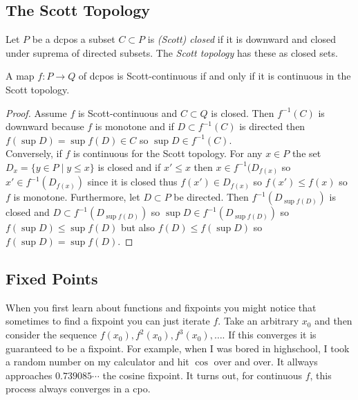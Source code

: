 \documentclass[12pt]{article}
\begin{document}
\subsection{The Scott Topology}

\begin{defn}
Let $P$ be a dcpos a subset $C \subset P$ is \textit{(Scott) closed} if it is downward and closed under suprema of directed subsets. The \textit{Scott topology} has these as closed sets.  
\end{defn}

\begin{prop}
A map $f : P \to Q$ of dcpos is Scott-continuous if and only if it is continuous in the Scott topology.  
\end{prop}

\begin{proof}
Assume $f$ is Scott-continuous and $C \subset Q$ is closed. Then $f^{-1}(C)$ is downward because $f$ is monotone and if $D \subset f^{-1}(C)$ is directed then $f(\sup D) = \sup f(D) \in C$ so $\sup D \in f^{-1}(C)$. 
\bigskip\\
Conversely, if $f$ is continuous for the Scott topology. For any $x \in P$ the set $D_x = \{ y \in P \mid y \le x \}$ is closed and if $x' \le x$ then $x \in f^{-1}(D_{f(x)}$ so $x' \in f^{-1}(D_{f(x)})$ since it is closed thus $f(x') \in D_{f(x)}$ so $f(x') \le f(x)$ so $f$ is monotone. Furthermore, let $D \subset P$ be directed. Then $f^{-1}(D_{\sup f(D)})$ is closed and $D \subset f^{-1}(D_{\sup f(D)})$ so $\sup D \in f^{-1}(D_{\sup f(D)})$ so $f(\sup D) \le \sup f(D)$ but also $f(D) \le f(\sup D)$ so $f(\sup D) = \sup f(D)$.  
\end{proof}

\subsection{Fixed Points}

\renewcommand{\fix}{\mathsf{fix}}
\renewcommand{\it}{\mathsf{it}}

When you first learn about functions and fixpoints you might notice that sometimes to find a fixpoint you can just iterate $f$. Take an arbitrary $x_0$ and then consider the sequence $f(x_0), f^2(x_0),  f^3(x_0), \dots$. If this converges it is guaranteed to be a fixpoint. For example, when I was bored in highschool, I took a random number on my calculator and hit $\cos$ over and over. It allways approaches $0.739085 \cdots$ the cosine fixpoint. It turns out, for continuous $f$, this process always converges in a cpo. 
\end{document}
